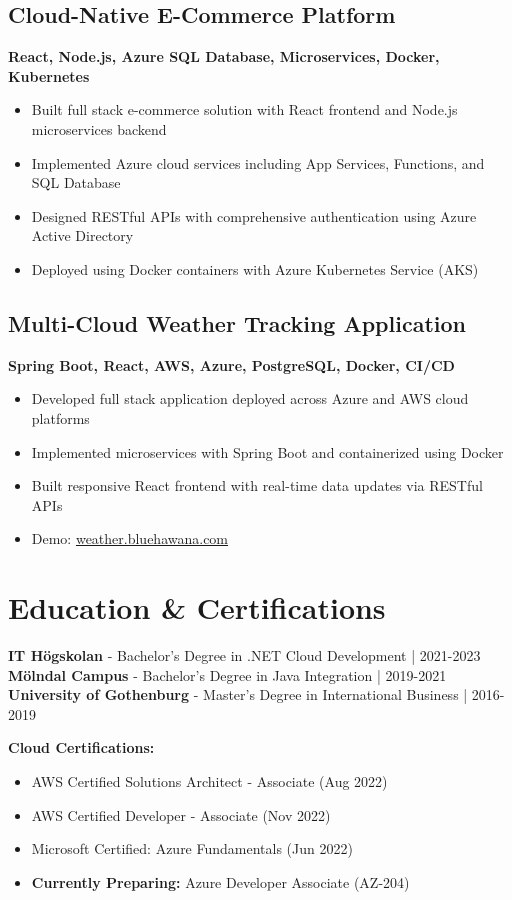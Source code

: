 \documentclass[11pt,a4paper]{article}
\begin{document}
\subsection{Cloud-Native E-Commerce Platform}
\textbf{React, Node.js, Azure SQL Database, Microservices, Docker, Kubernetes}
\begin{itemize}[noitemsep]
  \item Built full stack e-commerce solution with React frontend and Node.js microservices backend
  \item Implemented Azure cloud services including App Services, Functions, and SQL Database
  \item Designed RESTful APIs with comprehensive authentication using Azure Active Directory
  \item Deployed using Docker containers with Azure Kubernetes Service (AKS)
\end{itemize}

\subsection{Multi-Cloud Weather Tracking Application}
\textbf{Spring Boot, React, AWS, Azure, PostgreSQL, Docker, CI/CD}
\begin{itemize}[noitemsep]
  \item Developed full stack application deployed across Azure and AWS cloud platforms
  \item Implemented microservices with Spring Boot and containerized using Docker
  \item Built responsive React frontend with real-time data updates via RESTful APIs
  \item Demo: \href{https://weather.bluehawana.com}{weather.bluehawana.com}
\end{itemize}

\section*{Education \& Certifications}
\textbf{IT Högskolan} - Bachelor's Degree in .NET Cloud Development | 2021-2023\\
\textbf{Mölndal Campus} - Bachelor's Degree in Java Integration | 2019-2021\\
\textbf{University of Gothenburg} - Master's Degree in International Business | 2016-2019

\vspace{6pt}
\textbf{Cloud Certifications:}
\begin{itemize}[noitemsep]
\item AWS Certified Solutions Architect - Associate (Aug 2022)
\item AWS Certified Developer - Associate (Nov 2022)
\item Microsoft Certified: Azure Fundamentals (Jun 2022)
\item \textbf{Currently Preparing:} Azure Developer Associate (AZ-204)
\end{itemize}
\end{document}
